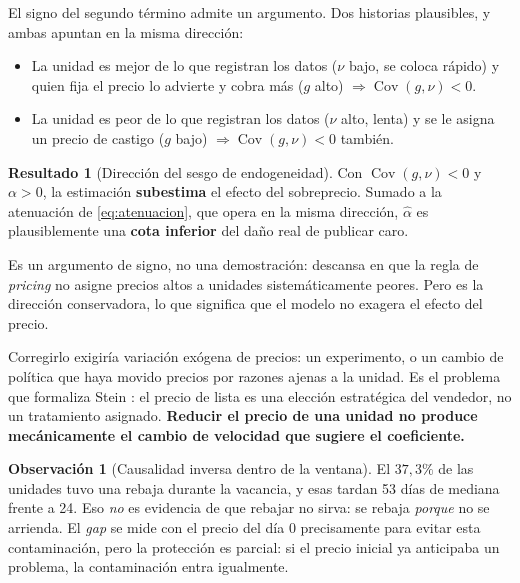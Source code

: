 \documentclass[11pt,a4paper]{article}
\theoremstyle{definition}
\newtheorem{resultado}{Resultado}
\newtheorem{observacion}{Observación}
\newcommand{\Cov}{\operatorname{Cov}}
\begin{document}
El signo del segundo término admite un argumento. Dos historias plausibles, y
ambas apuntan en la misma dirección:

\begin{itemize}[leftmargin=1.4em,itemsep=2pt]
\item La unidad es mejor de lo que registran los datos ($\nu$ bajo, se coloca
rápido) y quien fija el precio lo advierte y cobra más ($g$ alto)
$\Rightarrow \Cov(g,\nu)<0$.
\item La unidad es peor de lo que registran los datos ($\nu$ alto, lenta) y se le
asigna un precio de castigo ($g$ bajo) $\Rightarrow \Cov(g,\nu)<0$ también.
\end{itemize}

\begin{resultado}[Dirección del sesgo de endogeneidad]
Con $\Cov(g,\nu)<0$ y $\alpha>0$, la estimación \textbf{subestima} el efecto del
sobreprecio. Sumado a la atenuación de \eqref{eq:atenuacion}, que opera en la
misma dirección, $\hat{\alpha}$ es plausiblemente una \textbf{cota inferior} del
daño real de publicar caro.

Es un argumento de signo, no una demostración: descansa en que la regla de
\emph{pricing} no asigne precios altos a unidades sistemáticamente peores. Pero
es la dirección conservadora, lo que significa que el modelo no exagera el efecto
del precio.
\end{resultado}

Corregirlo exigiría variación exógena de precios: un experimento, o un cambio de
política que haya movido precios por razones ajenas a la unidad. Es el problema
que formaliza Stein \cite{stein1995}: el precio de lista es una elección
estratégica del vendedor, no un tratamiento asignado. \textbf{Reducir el precio de
una unidad no produce mecánicamente el cambio de velocidad que sugiere el
coeficiente.}

\begin{observacion}[Causalidad inversa dentro de la ventana]
El $37{,}3\%$ de las unidades tuvo una rebaja durante la vacancia, y esas tardan
53 días de mediana frente a 24. Eso \emph{no} es evidencia de que rebajar no
sirva: se rebaja \emph{porque} no se arrienda. El \emph{gap} se mide con el precio
del día 0 precisamente para evitar esta contaminación, pero la protección es
parcial: si el precio inicial ya anticipaba un problema, la contaminación entra
igualmente.
\end{observacion}

\end{document}
